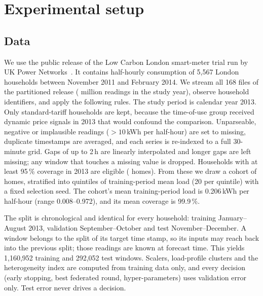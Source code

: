 \section{Experimental setup}\label{sec:setup}

\subsection{Data}
We use the public release of the Low Carbon London smart-meter trial run by UK Power Networks~\cite{ukpn2015lcl}.
It contains half-hourly consumption of 5{,}567 London households between November 2011 and February 2014. We stream
all 168 files of the partitioned release (\RowsInPeriod{} million readings in the study year), observe
\HouseholdsSeen{} household identifiers, and apply the following rules. The study period is calendar year 2013.
Only standard-tariff households are kept, because the time-of-use group received dynamic price signals in 2013 that
would confound the comparison. Unparseable, negative or implausible readings ($>10$\,kWh per half-hour) are set to
missing, duplicate timestamps are averaged, and each series is re-indexed to a full 30-minute grid. Gaps of up to
2\,h are linearly interpolated and longer gaps are left missing; any window that touches a missing value is dropped.
Households with at least 95\,\% coverage in 2013 are eligible (\HouseholdsEligible{} homes). From these we draw a
cohort of \NumHouseholds{} homes, stratified into quintiles of training-period mean load (20 per quintile) with a fixed
selection seed. The cohort's mean training-period load is 0.206\,kWh per half-hour (range 0.008--0.972), and its mean
coverage is 99.9\,\%.

The split is chronological and identical for every household: training January--August 2013, validation
September--October and test November--December. A window belongs to the split of its target time stamp, so its
inputs may reach back into the previous split; those readings are known at forecast time. This yields 1{,}160{,}952
training and 292{,}052 test windows. Scalers, load-profile clusters and the heterogeneity index are computed from
training data only, and every decision (early stopping, best federated round, hyper-parameters) uses validation error
only. Test error never drives a decision.

